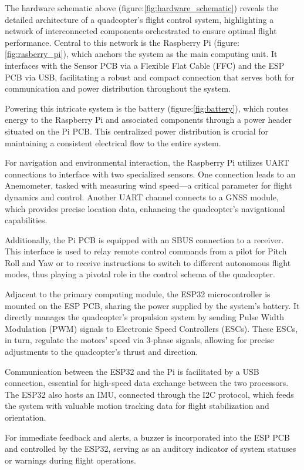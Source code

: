 \documentclass{article}
\begin{document}
The hardware schematic above (figure:\ref{fig:hardware_schematic}) reveals the detailed architecture of a quadcopter's flight control system, highlighting a network of interconnected components orchestrated to ensure optimal flight performance. Central to this network is the Raspberry Pi (figure:\ref{fig:rasberry_pi}), which anchors the system as the main computing unit. It interfaces with the Sensor PCB via a Flexible Flat Cable (FFC) and the ESP PCB via USB, facilitating a robust and compact connection that 
serves both for communication and power distribution throughout the system.

Powering this intricate system is the battery (figure:\ref{fig:battery}), which routes energy to the Raspberry Pi and associated components through a power header situated on the Pi PCB. This centralized power distribution is crucial for maintaining a consistent electrical flow to the entire system.

For navigation and environmental interaction, the Raspberry Pi utilizes UART connections to interface with two specialized sensors. One connection leads to an Anemometer, tasked with measuring wind speed—a critical parameter for flight dynamics and control. Another UART channel connects to a GNSS module, which provides precise location data, enhancing the quadcopter's navigational capabilities.

Additionally, the Pi PCB is equipped with an SBUS connection to a receiver. This interface is used to relay remote control commands from a pilot for Pitch Roll and Yaw or to receive instructions to switch to different autonomous flight modes, thus playing a pivotal role in the control schema of the quadcopter.

Adjacent to the primary computing module, the ESP32 microcontroller is mounted on the ESP PCB, sharing the power supplied by the system's battery. It directly manages the quadcopter's propulsion system by sending Pulse Width Modulation (PWM) signals to Electronic Speed Controllers (ESCs). These ESCs, in turn, regulate the motors' speed via 3-phase signals, allowing for precise adjustments to the quadcopter's thrust and direction.

Communication between the ESP32 and the Pi is facilitated by a USB connection, essential for high-speed data exchange between the two processors. The ESP32 also hosts an IMU, connected through the I2C protocol, which feeds the system with valuable motion tracking data for flight stabilization and orientation.

For immediate feedback and alerts, a buzzer is incorporated into the ESP PCB and controlled by the ESP32, serving as an auditory indicator of system statuses or warnings during flight operations.
\end{document}
